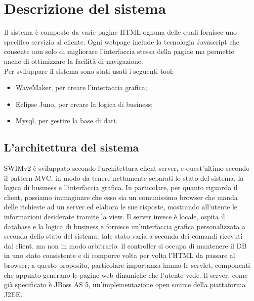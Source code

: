 \section{Descrizione del sistema}
Il sistema è composto da varie pagine HTML ognuna delle quali fornisce uno specifico servizio al cliente. Ogni webpage include la tecnologia Javascript che consente non solo di migliorare l’interfaccia stessa della pagine ma permette anche di ottimizzare la facilità di navigazione.\\[1\baselineskip]Per sviluppare il sistema sono stati usati i seguenti tool:
\begin{itemize}
\item WaveMaker, per creare l’interfaccia grafica;
\item Eclipse Juno, per creare la logica di business;
\item Mysql, per gestire la base di dati.
\end{itemize}

\vspace{1.2cm}

\subsection{L'architettura del sistema}

SWIMv2 è sviluppato secondo l'architettura client-server, e quest'ultimo secondo il pattern MVC, in modo da tenere nettamente separati lo stato del sistema, la logica di
business e l'interfaccia grafica. In particolare, per quanto riguarda il client, possiamo immaginare che esso sia un comunissimo browser che manda delle richieste ad un server ed
elabora le sue risposte, mostrando all'utente le informazioni desiderate tramite la view. Il server invece è locale, ospita il database e la logica di business e fornisce un'interfaccia grafica personalizzata a seconda dello stato del sistema; tale stato varia a seconda dei comandi ricevuti dal
client, ma non in modo arbitrario: il controller si occupa di mantenere il DB in uno stato consistente e di comporre volta per volta l'HTML da passare al browser; a questo proposito,
particolare importanza hanno le servlet, componenti che appunto generano le pagine web dinamiche che l'utente vede. Il server, come già specificato è JBoss AS 5, un'implementazione
open source della piattaforma J2EE.
\\

